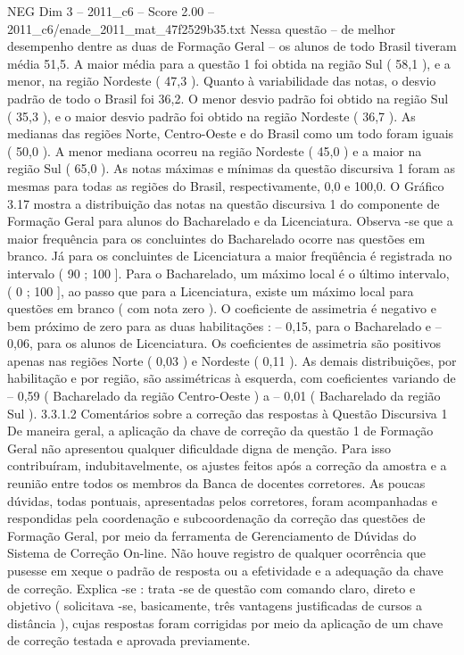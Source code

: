 \begin{textsample}{NEG Dim 3 – 2011\_c6 – Score 2.00 – 2011\_c6/enade\_2011\_mat\_47f2529b35.txt}
Nessa questão – de melhor desempenho dentre as duas de Formação Geral – os alunos de todo Brasil tiveram média 51,5.
A maior média para a questão 1 foi obtida na região Sul ( 58,1 ), e a menor, na região Nordeste ( 47,3 ).
Quanto à variabilidade das notas, o desvio padrão de todo o Brasil foi 36,2.
O menor desvio padrão foi obtido na região Sul ( 35,3 ), e o maior desvio padrão foi obtido na região Nordeste ( 36,7 ).
As medianas das regiões Norte, Centro-Oeste e do Brasil como um todo foram iguais ( 50,0 ).
A menor mediana ocorreu na região Nordeste ( 45,0 ) e a maior na região Sul ( 65,0 ).
As notas máximas e mínimas da questão discursiva 1 foram as mesmas para todas as regiões do Brasil, respectivamente, 0,0 e 100,0.
O Gráfico 3.17 mostra a distribuição das notas na questão discursiva 1 do componente de Formação Geral para alunos do Bacharelado e da Licenciatura.
Observa -se que a maior frequência para os concluintes do Bacharelado ocorre nas questões em branco.
Já para os concluintes de Licenciatura a maior freqüência é registrada no intervalo ( 90 ; 100 ].
Para o Bacharelado, um máximo local é o último intervalo, ( 0 ; 100 ], ao passo que para a Licenciatura, existe um máximo local para questões em branco ( com nota zero ).
O coeficiente de assimetria é negativo e bem próximo de zero para as duas habilitações : – 0,15, para o Bacharelado e – 0,06, para os alunos de Licenciatura.
Os coeficientes de assimetria são positivos apenas nas regiões Norte ( 0,03 ) e Nordeste ( 0,11 ).
As demais distribuições, por habilitação e por região, são assimétricas à esquerda, com coeficientes variando de – 0,59 ( Bacharelado da região Centro-Oeste ) a – 0,01 ( Bacharelado da região Sul ). 3.3.1.2 Comentários sobre a correção das respostas à Questão Discursiva 1 De maneira geral, a aplicação da chave de correção da questão 1 de Formação Geral não apresentou qualquer dificuldade digna de menção.
Para isso contribuíram, indubitavelmente, os ajustes feitos após a correção da amostra e a reunião entre todos os membros da Banca de docentes corretores.
As poucas dúvidas, todas pontuais, apresentadas pelos corretores, foram acompanhadas e respondidas pela coordenação e subcoordenação da correção das questões de Formação Geral, por meio da ferramenta de Gerenciamento de Dúvidas do Sistema de Correção On-line.
Não houve registro de qualquer ocorrência que pusesse em xeque o padrão de resposta ou a efetividade e a adequação da chave de correção.
Explica -se : trata -se de questão com comando claro, direto e objetivo ( solicitava -se, basicamente, três vantagens justificadas de cursos a distância ), cujas respostas foram corrigidas por meio da aplicação de um chave de correção testada e aprovada previamente.

\end{textsample}
